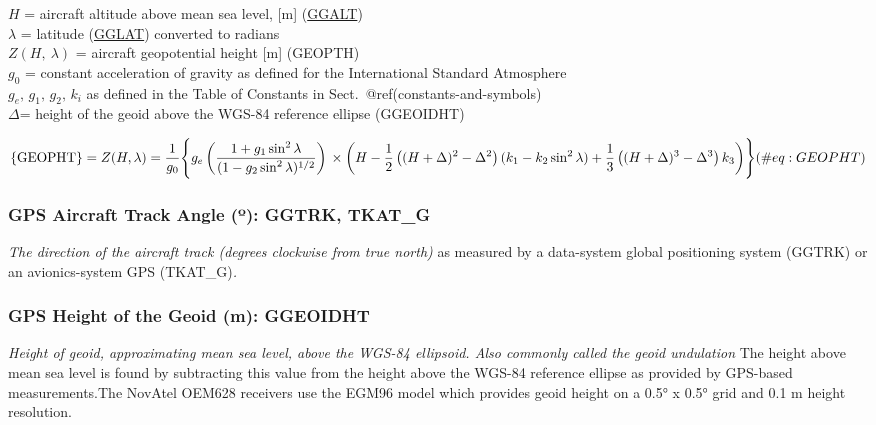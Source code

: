 \documentclass[
  english,
]{book}
\begin{document}
\(H\) = aircraft altitude above mean sea level, {[}m{]}
(\protect\hyperlink{ggalt}{GGALT})\\
\(\lambda\) = latitude (\protect\hyperlink{gglat}{GGLAT}) converted to
radians\\
\(Z(H,\ \lambda)\) = aircraft geopotential height {[}m{]} (GEOPTH)\\
\(g_{0}\) = constant acceleration of gravity as defined for the
International Standard Atmosphere\\
\(g_{e},\,g_{1},\,g_{2},\,k_{i}\) as defined in the Table of Constants
in Sect.~@ref(constants-and-symbols)\\
\(\Delta\)= height of the geoid above the WGS-84 reference ellipse
(GGEOIDHT)

\begin{equation}
\mathrm{\{GEOPHT\}}=Z(H,\lambda)=\frac{1}{g_{0}}\Biggl\{ g_{e}\left(\frac{1+g_{1}\sin^{2}\lambda}{(1-g_{2}\sin^{2}\lambda)^{1/2}}\right) \notag \\   
\times \left(H-\frac{1}{2}\left((H+\Delta)^{2}-\Delta^{2}\right)(k_{1}-k_{2}\sin^{2}\lambda)+\frac{1}{3}\left((H+\Delta)^{3}-\Delta^{3}\right)k_{3}\right)\Biggr\}  
(\#eq:GEOPHT)
\end{equation}

\hypertarget{ggtrk}{%
\subsubsection*{\texorpdfstring{GPS Aircraft Track Angle ({º}): GGTRK,
TKAT\_G}{GPS Aircraft Track Angle (º): GGTRK, TKAT\_G}}\label{ggtrk}}

\emph{The direction of the aircraft track (degrees clockwise from true
north)} as measured by a data-system global positioning system (GGTRK)
or an avionics-system GPS (TKAT\_G)\emph{.}

\hypertarget{ggeoidht}{%
\subsubsection*{GPS Height of the Geoid (m): GGEOIDHT}\label{ggeoidht}}

\emph{Height of geoid, approximating mean sea level, above the WGS-84
ellipsoid. Also commonly called the geoid undulation} The height above
mean sea level is found by subtracting this value from the height above
the WGS-84 reference ellipse as provided by GPS-based measurements.The
NovAtel OEM628 receivers use the EGM96 model which provides geoid height
on a 0.5° x 0.5° grid and 0.1 m height resolution.
\end{document}
